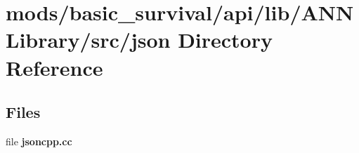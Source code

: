 \section{mods/basic\+\_\+survival/api/lib/\+A\+N\+N\+Library/src/json Directory Reference}
\label{dir_4c51fb4945a96a16acd5240c9186dcc8}
\subsection*{Files}
\begin{DoxyCompactItemize}
\item 
file {\bfseries jsoncpp.\+cc}
\end{DoxyCompactItemize}
